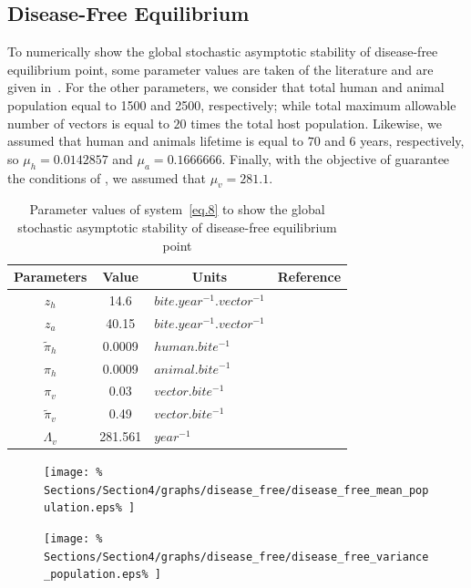 \subsection{Disease-Free Equilibrium} 
		To numerically show the global stochastic asymptotic stability of 
	disease-free equilibrium point, some parameter values are taken of the 
	literature and are given in~. For the other parameters, we 
	consider that total human and animal population equal to \num{1500} and 
	\num{2500}, 
	respectively; while total maximum allowable number of vectors is equal to 
	$20$ times the total host population. Likewise, we assumed that human and 
	animals lifetime is equal to $70$ and $6$ years, respectively, so 
	$\mu_{h} = \num{0.0142857}$ and $\mu_{a} = \num{0.1666666}$. 
	Finally, with the objective of guarantee the conditions 
	of , we assumed that $\mu_{v}= \num{281.1}$.
\begin{table}[htb]
	\centering
	\caption{Parameter values of system~\eqref{eq.8} to show the global 
		stochastic asymptotic stability of disease-free equilibrium point
	}\label{table:2}
	\begin{tabular}{cclc}
		\toprule
		Parameters & Value & \multicolumn{1}{c}{Units} & Reference\\
		\midrule
			$z_{h}$ 					& 14.6		&	$\si{bite.year^{-1}.vector^{-1}}$
				&	\cite{Cruz-Pacheco2012a} \\
			$z_{a}$ 					& 40.15		&	$\si{bite.year^{-1}.vector^{-1}}$
				&	\cite{Cruz-Pacheco2012a} \\
			$\tilde{\pi}_{h}$ & 0.0009	&	$\si{human.bite^{-1}}$
				&	\cite{Cohen2001} \\
			$\pi_{h}$ 				& 0.0009	&	$\si{animal.bite^{-1}}$
				&	\cite{Cruz-Pacheco2012a} \\
			$\pi_{v}$ 				& 0.03		&	$\si{vector.bite^{-1}}$
				&	\cite{Cohen2001}				 \\
			$\tilde{\pi}_{v}$ & 0.49		&	$\si{vector.bite^{-1}}$
				&	\cite{Cohen2001}				 \\
			$\Lambda_{v}$ 		& 281.561	&	$\si{year^{-1}}$
				&	\cite{Rabinovich1972}		 \\
			\bottomrule
		\end{tabular}
\end{table}
%
\begin{figure}[!ht]
	\centering
	\caption{}\label{Fig.1}
\end{figure}
\begin{figure}[!ht]
	\centering
	\texttt{[image: \%
		Sections/Section4/graphs/disease\_free/disease\_free\_mean\_population.eps\%
		]}%
	\caption{}\label{Fig.2}
\end{figure}
\begin{figure}[!ht]
	\centering
	\texttt{[image: \%
		Sections/Section4/graphs/disease\_free/disease\_free\_variance\_population.eps\%
	]}
\caption{}\label{Fig.3}
\end{figure}

